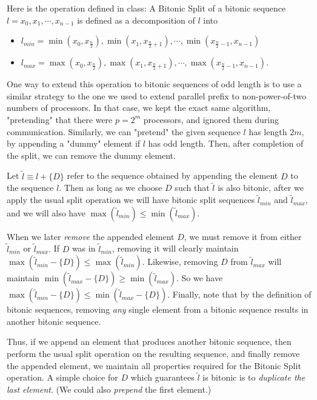 \documentclass{article}
\begin{document}
\quad Here is the operation defined in class: A Bitonic Split of a bitonic sequence $l = x_0, x_1, \cdots, x_{n-1}$ is defined as a decomposition of $l$ into
\begin{itemize}
  \item $l_{min} = \min{(x_0, x_{\frac{n}{2}})}, \min{(x_1, x_{\frac{n}{2} + 1})}, \cdots, \min{(x_{\frac{n}{2} - 1}, x_{n-1})}$
  \item $l_{max} = \max{(x_0, x_{\frac{n}{2}})}, \max{(x_1, x_{\frac{n}{2} + 1})}, \cdots, \max{(x_{\frac{n}{2} - 1}, x_{n-1})}.$
\end{itemize}

One way to extend this operation to bitonic sequences of odd length is to use a similar strategy to the one we used to extend parallel prefix to non-power-of-two numbers of processors.
In that case, we kept the exact same algorithm, "pretending" that there were $p = 2^{m}$ processors, and ignored them during communication.
Similarly, we can "pretend" the given sequence $l$ has length $2m$, by appending a "dummy" element if $l$ has odd length.
Then, after completion of the split, we can remove the dummy element.

Let $\tilde{l} \equiv l + \{D\}$ refer to the sequence obtained by appending the element $D$ to the sequence $l$.
Then as long as we choose $D$ such that $\tilde{l}$ is also bitonic, after we apply the usual split operation we will have bitonic split sequences $\tilde{l}_{min}$ and $\tilde{l}_{max}$, and we will also have $\max{(\tilde{l}_{min})} \leq \min{(\tilde{l}_{max})}.$

When we later \textit{remove} the appended element $D$, we must remove it from either $\tilde{l}_{min}$ or $\tilde{l}_{max}.$
If $D$ was in $\tilde{l}_{min}$, removing it will clearly maintain $\max{\left(\tilde{l}_{min} - \{D\}\right)} \leq \max{\left(\tilde{l}_{min}\right)}$.
Likewise, removing $D$ from $\tilde{l}_{max}$ will maintain $\min{\left(\tilde{l}_{max} - \{D\}\right)} \geq \min{\left(\tilde{l}_{max}\right)}$.
So we have $\max{\left(\tilde{l}_{min} - \{D\}\right)} \leq \min{\left(\tilde{l}_{max} - \{D\}\right)}.$
Finally, note that by the definition of bitonic sequences, removing \textit{any} single element from a bitonic sequence results in another bitonic sequence.

Thus, if we append an element that produces another bitonic sequence, then perform the usual split operation on the resulting sequence, and finally remove the appended element, we maintain all properties required for the Bitonic Split operation.
A simple choice for $D$ which guarantees $\tilde{l}$ is bitonic is to \textit{duplicate the last element}.
(We could also \textit{prepend} the first element.)
\end{document}
